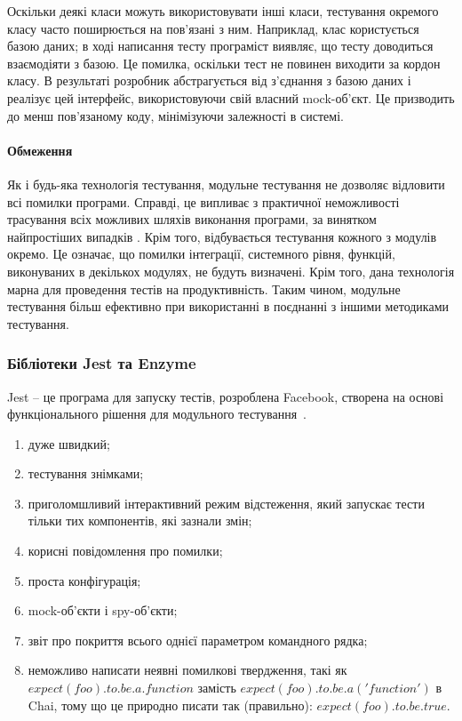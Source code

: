 Оскільки деякі класи можуть використовувати інші класи, тестування окремого класу часто поширюється на пов'язані з ним. Наприклад, клас користується базою даних; в ході написання тесту програміст виявляє, що тесту доводиться взаємодіяти з базою. Це помилка, оскільки тест не повинен виходити за кордон класу. В результаті розробник абстрагується від з'єднання з базою даних і реалізує цей інтерфейс, використовуючи свій власний mock-об'єкт. Це призводить до менш пов'язаному коду, мінімізуючи залежності в системі.

\paragraph{Обмеження}

Як і будь-яка технологія тестування, модульне тестування не дозволяє відловити всі помилки програми. Справді, це випливає з практичної неможливості трасування всіх можливих шляхів виконання програми, за винятком найпростіших випадків \cite{бородіна2018selenium}. Крім того, відбувається тестування кожного з модулів окремо. Це означає, що помилки інтеграції, системного рівня, функцій, виконуваних в декількох модулях, не будуть визначені. Крім того, дана технологія марна для проведення тестів на продуктивність. Таким чином, модульне тестування більш ефективно при використанні в поєднанні з іншими методиками тестування.

\subsubsection{Бібліотеки Jest та Enzyme}

Jest -- це програма для запуску тестів, розроблена Facebook, створена на основі функціонального рішення для модульного тестування~\cite{9781680506464}.

\begin{enumerate}
    \item дуже швидкий;
    \item тестування знімками;
    \item приголомшливий інтерактивний режим відстеження, який запускає тести тільки тих компонентів, які зазнали змін;
    \item корисні повідомлення про помилки;
    \item проста конфігурація;
    \item mock-об'єкти і spy-об'єкти;
    \item звіт про покриття всього однієї параметром командного рядка;
    \item неможливо написати неявні помилкові твердження, такі як $expect(foo).to.be.a.function$ замість $expect(foo). to.be.a( 'function')$ в Chai, тому що це природно писати так (правильно): $expect(foo).to.be.true.$
\end{enumerate}

